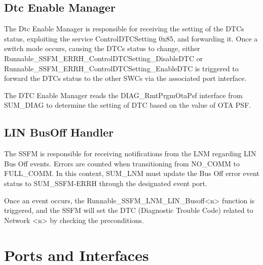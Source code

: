 \subsection{Dtc Enable Manager}
\label{subsec:DTCEnableManager}

The Dtc Enable Manager is responsible for receiving the setting of the DTCs status, exploiting the service ControlDTCSetting 0x85, and forwarding it.
Once a switch mode occurs, causing the DTCs status to change, either Runnable_SSFM_ERRH_ControlDTCSetting_DisableDTC or Runnable_SSFM_ERRH_ControlDTCSetting_EnableDTC is triggered to forward the DTCs status to the other SWCs via the associated port interface.


The DTC Enable Manager reads the DIAG_RmtPrgmOtaPsf interface from SUM_DIAG to determine the setting of DTC based on the value of OTA PSF.

{   }


\subsection{LIN BusOff Handler}
\label{subsec:LinBusoffDTCNotification}

The SSFM is responsible for receiving notifications from the LNM regarding LIN Bus Off events. 
Errors are counted when transitioning from NO_COMM to FULL_COMM. In this context, 
SUM_LNM must update the Bus Off error event status to SUM_SSFM-ERRH through the designated event port.

Once an event occurs, the Runnable_SSFM_LNM_LIN_Busoff<n> function is triggered, and the SSFM will set the DTC (Diagnostic Trouble Code) related to Network <n> by checking the preconditions.

{    }


\section{Ports and Interfaces}
\label{sec:portInterfaces}
 \\
{
    
}

